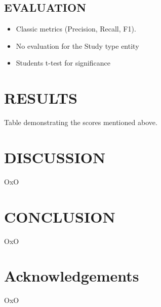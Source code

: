 \documentclass[10.7pt,]{article}
\begin{document}
\subsection{EVALUATION}\label{eval}
%
\begin{itemize}
    \item Classic metrics (Precision, Recall, F1).
    \item No evaluation for the Study type entity
    \item Students t-test for significance
\end{itemize}
%
%
%
\section{RESULTS}\label{results}
%
Table demonstrating the scores mentioned above.
%
%
%
\section{DISCUSSION}\label{discussion}
%
OxO
%
%
%
\section{CONCLUSION}\label{conclusion}
%
OxO
%
%
%
\section{Acknowledgements}\label{acknowledgements}
%
OxO
%
%
%


\end{document}
